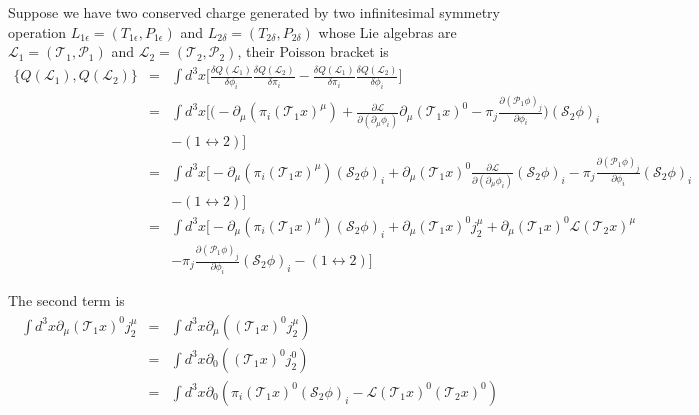 \documentclass[12pt]{book}
\begin{document}
	Suppose we have two conserved charge generated by two infinitesimal symmetry operation $L_{1\epsilon}=(T_{1\epsilon}, P_{1\epsilon})$ and $L_{2\delta}=(T_{2\delta}, P_{2\delta})$ whose Lie algebras  are $\mathcal L_1=(\mathcal T_1,\mathcal P_1)$ and $\mathcal L_2=(\mathcal T_2,\mathcal P_2)$, their Poisson bracket is 
	\begin{eqnarray}
		\{Q(\mathcal L_1),Q(\mathcal L_2)\}&=&\int d^3x\Big[\frac{\delta Q(\mathcal L_1)}{\delta \phi_i}\frac{\delta Q(\mathcal L_2)}{\delta \pi_i}-\frac{\delta Q(\mathcal L_1)}{\delta \pi_i}\frac{\delta Q(\mathcal L_2)}{\delta \phi_i}\Big]\\
		&=&\int d^3x\Big[\Big(-\partial_\mu(\pi_i(\mathcal T_1x)^\mu)+\frac{\partial \mathcal L}{\partial (\partial_\mu\phi_i)}\partial_\mu(\mathcal T_1x)^0-\pi_j\frac{\partial(\mathcal P_1\phi)_j}{\partial\phi_i}\Big)(\mathcal S_2 \phi)_i \nonumber\\
		&&-(1\leftrightarrow 2)\Big]\\
		&=&\int d^3x\Big[-\partial_\mu(\pi_i(\mathcal T_1x)^\mu)(\mathcal S_2 \phi)_i+\partial_\mu(\mathcal T_1x)^0\frac{\partial \mathcal L}{\partial (\partial_\mu\phi_i)}(\mathcal S_2 \phi)_i -\pi_j\frac{\partial(\mathcal P_1\phi)_j}{\partial\phi_i}(\mathcal S_2 \phi)_i\nonumber\\
		&&-(1\leftrightarrow 2)\Big]\\
		&=&\int d^3x\Big[-\partial_\mu(\pi_i(\mathcal T_1x)^\mu)(\mathcal S_2 \phi)_i+\partial_\mu(\mathcal T_1x)^0j_2^\mu+\partial_\mu(\mathcal T_1x)^0\mathcal L (\mathcal T_2x)^\mu \nonumber\\
		&&-\pi_j\frac{\partial(\mathcal P_1\phi)_j}{\partial\phi_i}(\mathcal S_2 \phi)_i-(1\leftrightarrow 2)\Big]\label{eqn:Q-temp}
	\end{eqnarray}
	
	The second term is 
	\begin{eqnarray}
		\int d^3x\partial_\mu(\mathcal T_1x)^0j_2^\mu&=&\int d^3x\partial_\mu((\mathcal T_1x)^0j_2^\mu)\\
		&=&\int d^3x\partial_0((\mathcal T_1x)^0j_2^0)\\
		&=&\int d^3x\partial_0(\pi_i(\mathcal T_1x)^0(\mathcal S_2 \phi)_i-\mathcal{L}(\mathcal T_1x)^0(\mathcal T_2x)^0)\label{eqn:2nd-term}
	\end{eqnarray}
		
\end{document}
